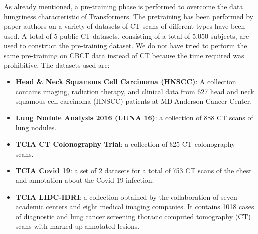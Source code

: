 As already mentioned, a pre-training phase is performed to overcome the data
hungriness characteristic of Transformers. The pretraining has been performed by
paper authors on a variety of datasets of CT scans of different types have been
used. A total of 5 public CT datasets, consisting of a total of 5,050 subjects,
are used to construct the pre-training dataset. We do not have tried to perform the
same pre-training on CBCT data instead of CT because the time required was
prohibitive.
The datasets used are:
\begin{itemize}
  \item{\textbf{Head \& Neck Squamous Cell Carcinoma (HNSCC)}: A collection
    contains imaging, radiation therapy, and clinical data from 627 head and
    neck squamous cell carcinoma (HNSCC) patients at MD Anderson Cancer Center.}
  \item{\textbf{Lung Nodule Analysis 2016 (LUNA 16)}: a collection of 888 CT
    scans of lung nodules.}
  \item{\textbf{TCIA CT Colonography Trial}: a collection of 825 CT colonography
    scans.}
  \item{\textbf{TCIA Covid 19}: a set of 2 datasets for a total of 753 CT scans of
    the chest and annotation about the Covid-19 infection.}
  \item{\textbf{TCIA LIDC-IDRI}: a collection obtained by the collaboration of
    seven academic centers and eight medical imaging companies. It contains 1018
    cases of diagnostic and lung cancer screening thoracic computed tomography
    (CT) scans with marked-up annotated lesions.}
\end{itemize}


